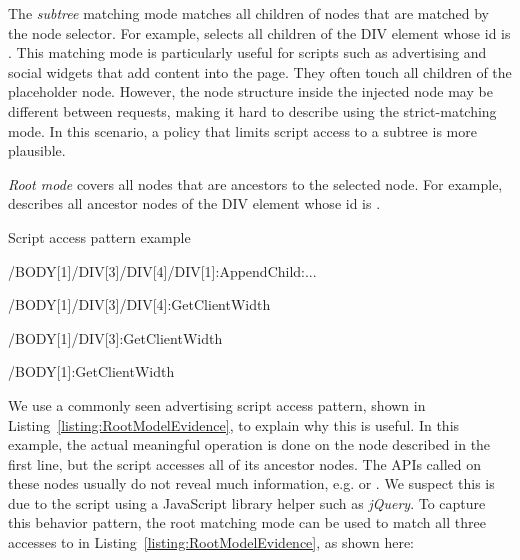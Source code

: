 The \emph{subtree} matching mode matches all children of nodes that are
matched by the node selector.  For example,
 selects all children of the DIV element
whose id is .  This matching mode is particularly useful for
scripts such as advertising and social widgets that add content into the
page.  They often touch all children of the placeholder node.  However,
the node structure inside the injected node may be different between
requests, making it hard to describe using the strict-matching mode.  In
this scenario, a policy that limits script access to a subtree is
more plausible.

\emph{Root mode} covers all nodes that are ancestors to the selected node.  For example,
describes all ancestor nodes of the DIV element whose id is .  

\begin{algorithm}[bth]
  \caption{Script access pattern example}
  \label{listing:RootModelEvidence}
  \begin{algorithmic}[1]
		\Statex \hspace{-15pt} /BODY[1]/DIV[3]/DIV[4]/DIV[1]:AppendChild:...\par
		\Statex \hspace{-15pt} /BODY[1]/DIV[3]/DIV[4]:GetClientWidth\par
		\Statex \hspace{-15pt} /BODY[1]/DIV[3]:GetClientWidth\par
		\Statex \hspace{-15pt} /BODY[1]:GetClientWidth\par
  \end{algorithmic}
\end{algorithm}

We use a commonly seen advertising script access pattern, shown in
Listing~\ref{listing:RootModelEvidence}, to explain why this is useful.
In this example, the actual meaningful operation is done on the node
described in the first line, but the script accesses all of its
ancestor nodes.  The APIs called on these nodes usually do not reveal
much information, e.g.  or .  We suspect this is due to the script using a
JavaScript library helper such as \emph{jQuery}.  To capture this
behavior pattern, the root matching mode can be used to match all three
accesses to  in Listing~\ref{listing:RootModelEvidence}, as shown here:

